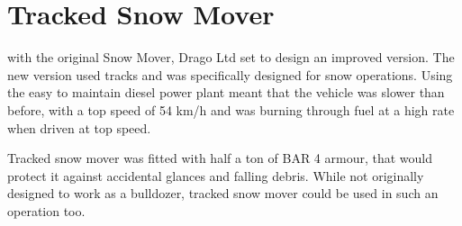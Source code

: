 \documentclass{tufte-book}
\begin{document}
\section{Tracked Snow Mover}
 with the original Snow Mover, Drago Ltd set to
design an improved version. The new version used tracks and was specifically
designed for snow operations. Using the easy to maintain diesel power
plant meant that the vehicle was slower than before, with a top speed
of 54 km/h and was burning through fuel at a high rate when driven at top
speed.

Tracked snow mover was fitted with half a ton of BAR 4 armour, that would
protect it against accidental glances and falling debris. While not
originally designed to work as a bulldozer, tracked snow mover could be used
in such an operation too.
\end{document}
